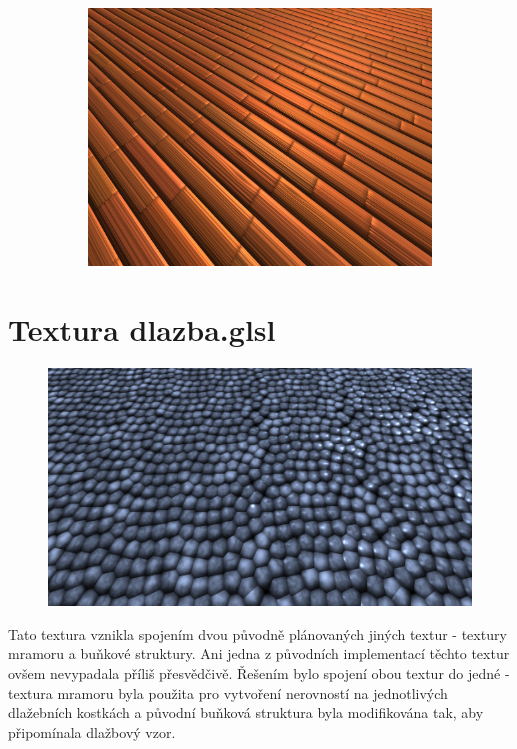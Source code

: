 \documentclass[12pt,a4paper,titlepage,final]{report}
\begin{document}
\begin{figure}[h]
	\begin{subfigure}[b]{0.60\textwidth}
		\captionsetup{type=figure}
		\includegraphics[width=\textwidth]{images/drevo-full.png}
		\label{fig:drevo-full}
	\end{subfigure}
\end{figure}

\section{Textura dlazba.glsl}

\begin{figure}[h]
	\centering
	\captionsetup{type=figure}
	\includegraphics[width=\textwidth]{images/dlazba.png}
\end{figure} 

Tato textura vznikla spojením dvou původně plánovaných jiných textur - textury mramoru a buňkové struktury. Ani jedna z původních implementací těchto textur ovšem nevypadala příliš přesvědčivě. Řešením bylo spojení obou textur do jedné - textura mramoru byla použita pro vytvoření nerovností na jednotlivých dlažebních kostkách a původní buňková struktura byla modifikována tak, aby připomínala dlažbový vzor. 
\end{document}
